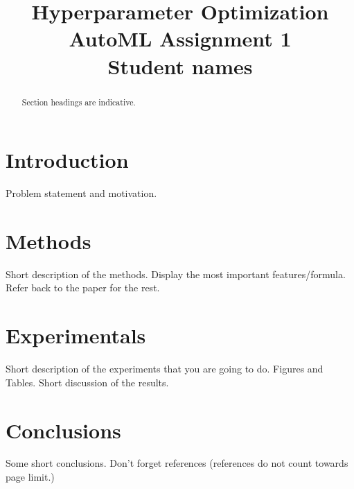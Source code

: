 \documentclass[12pt]{article}
\title{Hyperparameter Optimization \\ \large AutoML Assignment 1 \\ \small Student names}
\date{}
\author{}
\begin{document}
\maketitle

\vspace{-2.8cm}

\begin{abstract}
  Section headings are indicative. 
\end{abstract}

\section{Introduction}

Problem statement and motivation. 


\section{Methods}

Short description of the methods. Display the most important features/formula. Refer back to the paper for the rest. 


\section{Experimentals}

Short description of the experiments that you are going to do. Figures and Tables. Short discussion of the results. 

\section{Conclusions}

Some short conclusions. Don't forget references (references do not count towards page limit.)



\end{document}
